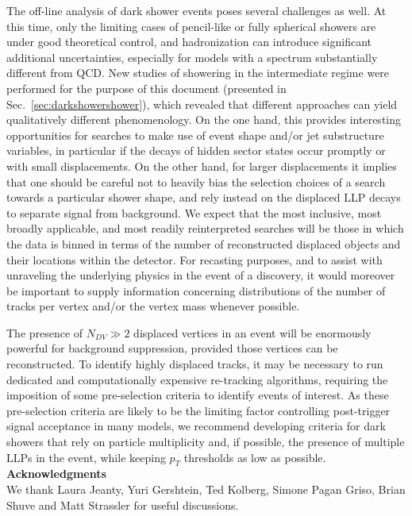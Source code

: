 The off-line analysis of dark shower events poses several challenges as well. At this time, only the limiting cases of pencil-like or fully spherical showers are under good theoretical control, and hadronization can introduce significant additional uncertainties, especially for models with a spectrum substantially different from QCD. New studies of showering in the intermediate regime were performed for the purpose of this document (presented in Sec.~\ref{sec:darkshowershower}), which revealed that different approaches can yield qualitatively different phenomenology. On the one hand, this provides interesting opportunities for searches to make use of event shape and/or jet substructure variables, in particular if the decays of  hidden sector states occur promptly or with small displacements. On the other hand, for larger displacements it implies that one should be careful not to heavily bias the selection choices of a search towards a particular shower shape, and rely instead on the displaced LLP decays to separate signal from background. We expect that the most inclusive, most broadly applicable, and most readily reinterpreted searches will be those in which the data is binned in terms of the number of reconstructed displaced objects and their locations within the detector. For recasting purposes, and to assist with unraveling the underlying physics in the event of a discovery, it would moreover be important to supply information concerning distributions of the number of tracks per vertex and/or the vertex mass whenever possible.

The presence of $N_{DV}\gg 2$ displaced vertices in an event will be enormously powerful for background suppression, provided those vertices can be reconstructed. To identify highly displaced tracks, it may be necessary to run dedicated and  computationally expensive re-tracking algorithms, requiring the imposition of some pre-selection criteria to identify events of interest. As these pre-selection criteria are likely to be the limiting factor controlling post-trigger signal acceptance in many models, we recommend developing criteria for dark showers that rely on particle multiplicity and, if possible,  the presence of multiple LLPs in the event, while keeping $p_T$ thresholds as low as possible.  \\

\vspace{1cm}
\textbf{Acknowledgments}\\
We thank Laura Jeanty, Yuri Gershtein, Ted Kolberg, Simone Pagan Griso, Brian Shuve and Matt Strassler for useful discussions.

